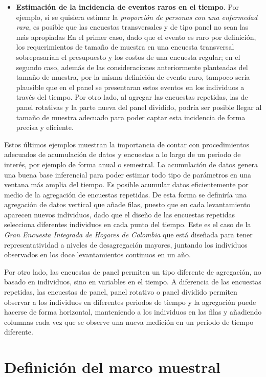 \documentclass[
  10pt,
  spanish,
]{book}
\begin{document}
\begin{itemize}
\item
  \textbf{Estimación de la incidencia de eventos raros en el tiempo}. Por ejemplo, si se quisiera estimar la \emph{proporción de personas con una enfermedad rara}, es posible que las encuestas transversales y de tipo panel no sean las más apropiadas En el primer caso, dado que el evento es raro por definición, los requerimientos de tamaño de muestra en una encuesta transversal sobrepasarían el presupuesto y los costos de una encuesta regular; en el segundo caso, además de las consideraciones anteriormente planteadas del tamaño de muestra, por la misma definición de evento raro, tampoco sería plausible que en el panel se presentaran estos eventos en los individuos a través del tiempo. Por otro lado, al agregar las encuestas repetidas, las de panel rotativas y la parte nueva del panel dividido, podría ser posible llegar al tamaño de muestra adecuado para poder captar esta incidencia de forma precisa y eficiente.
\end{itemize}

Estos últimos ejemplos muestran la importancia de contar con procedimientos adecuados de acumulación de datos y encuestas a lo largo de un periodo de interés, por ejemplo de forma anual o semestral. La acumulación de datos genera una buena base inferencial para poder estimar todo tipo de parámetros en una ventana más amplia del tiempo. Es posible acumular datos eficientemente por medio de la agregación de encuestas repetidas. De esta forma se definiría una agregación de datos vertical que añade filas, puesto que en cada levantamiento aparecen nuevos individuos, dado que el diseño de las encuestas repetidas selecciona diferentes individuos en cada punto del tiempo. Este es el caso de la \emph{Gran Encuesta Integrada de Hogares de Colombia} que está diseñada para tener representatividad a niveles de desagregación mayores, juntando los individuos observados en los doce levantamientos continuos en un año.

Por otro lado, las encuestas de panel permiten un tipo diferente de agregación, no basado en individuos, sino en variables en el tiempo. A diferencia de las encuestas repetidas, las encuestas de panel, panel rotativo o panel dividido permiten observar a los individuos en diferentes periodos de tiempo y la agregación puede hacerse de forma horizontal, manteniendo a los individuos en las filas y añadiendo columnas cada vez que se observe una nueva medición en un periodo de tiempo diferente.

\hypertarget{definiciuxf3n-del-marco-muestral}{%
\chapter{Definición del marco muestral}\label{definiciuxf3n-del-marco-muestral}}
\end{document}
